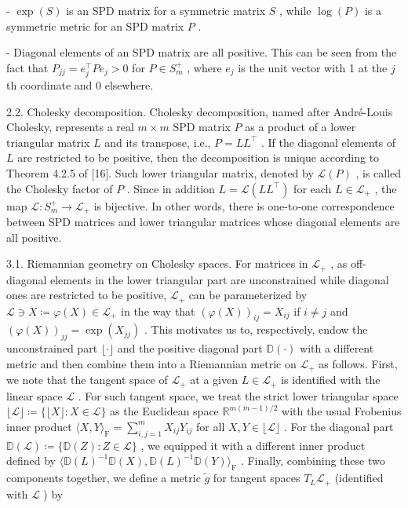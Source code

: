 \documentclass[11pt]{article}
\begin{document}
-  $\exp(S)$  is an SPD matrix for a symmetric matrix  $S$ , while  $\log(P)$  is a symmetric metric for an SPD matrix  $P$ .

- Diagonal elements of an SPD matrix are all positive. This can be seen from the fact that  $P_{jj} = e_j^\top Pe_j > 0$  for  $P \in S_m^+$ , where  $e_j$  is the unit vector with 1 at the  $j$ th coordinate and 0 elsewhere.

2.2. Cholesky decomposition. Cholesky decomposition, named after André-Louis Cholesky, represents a real  $m \times m$  SPD matrix  $P$  as a product of a lower triangular matrix  $L$  and its transpose, i.e.,  $P = LL^{\top}$ . If the diagonal elements of  $L$  are restricted to be positive, then the decomposition is unique according to Theorem 4.2.5 of [16]. Such lower triangular matrix, denoted by  $\mathcal{L}(P)$ , is called the Cholesky factor of  $P$ . Since in addition  $L = \mathcal{L}(LL^{\top})$  for each  $L \in \mathcal{L}_{+}$ , the map  $\mathcal{L}: S_{m}^{+} \to \mathcal{L}_{+}$  is bijective. In other words, there is one-to-one correspondence between SPD matrices and lower triangular matrices whose diagonal elements are all positive.

3.1. Riemannian geometry on Cholesky spaces. For matrices in  $\mathcal{L}_{+}$ , as off-diagonal elements in the lower triangular part are unconstrained while diagonal ones are restricted to be positive,  $\mathcal{L}_{+}$  can be parameterized by  $\mathcal{L} \ni X \coloneqq \varphi(X) \in \mathcal{L}_{+}$  in the way that  $(\varphi(X))_{ij} = X_{ij}$  if  $i \neq j$  and  $(\varphi(X))_{jj} = \exp(X_{jj})$ . This motivates us to, respectively, endow the unconstrained part  $\lfloor \cdot \rfloor$  and the positive diagonal part  $\mathbb{D}(\cdot)$  with a different metric and then combine them into a Riemannian metric on  $\mathcal{L}_{+}$  as follows. First, we note that the tangent space of  $\mathcal{L}_{+}$  at a given  $L \in \mathcal{L}_{+}$  is identified with the linear space  $\mathcal{L}$ . For such tangent space, we treat the strict lower triangular space  $\lfloor \mathcal{L} \rfloor \coloneqq \{\lfloor X \rfloor : X \in \mathcal{L}\}$  as the Euclidean space  $\mathbb{R}^{m(m-1)/2}$  with the usual Frobenius inner product  $\langle X, Y \rangle_{\mathrm{F}} = \sum_{i,j=1}^{m} X_{ij} Y_{ij}$  for all  $X, Y \in \lfloor \mathcal{L} \rfloor$ . For the diagonal part  $\mathbb{D}(\mathcal{L}) \coloneqq \{\mathbb{D}(Z) : Z \in \mathcal{L}\}$ , we equipped it with a different inner product defined by  $\langle \mathbb{D}(L)^{-1} \mathbb{D}(X), \mathbb{D}(L)^{-1} \mathbb{D}(Y) \rangle_{\mathrm{F}}$ . Finally, combining these two components together, we define a metric  $\tilde{g}$  for tangent spaces  $T_L \mathcal{L}_{+}$  (identified with  $\mathcal{L}$ ) by
\end{document}
